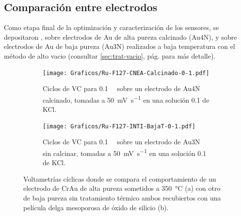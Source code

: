     \subsection{Comparación entre electrodos}


    	Como etapa final de la optimización y caracterización de los sensores, se depositaron \pdm, sobre electrodos de Au de alta pureza calcinado (Au4N), y sobre electrodos de Au de baja pureza (Au3N) realizados a baja temperatura con el método de alto vacio (consultar \ref{sec:trat-vacio}, pág. \pageref{sec:trat-vacio} para más detalle). 

    			 \begin{figure}[ht!]
		 	      \begin{subfigure}[t]{0.495\textwidth}
		          	\texttt{[image: Graficos/Ru-F127-CNEA-Calcinado-0-1.pdf]}
		         	\caption{Ciclos de VC para \ru\space \SI{0.1}{\milli\Molar} sobre un electrodo de Au4N calcinado, tomadas a \SI{50}{\milli\volt\per\second} en una solución \SI{0.1}{\Molar} de KCl.}
		          	\label{fig:Au4N-Ru1mM}
		      		\end{subfigure}
		      	 \begin{subfigure}[t]{0.495\textwidth}
		          	\texttt{[image: Graficos/Ru-F127-INTI-BajaT-0-1.pdf]}
		         	\caption{Ciclos de VC para \ru\space \SI{0.1}{\milli\Molar} sobre un electrodo de Au3N sin calcinar, tomadas a \SI{50}{\milli\volt\per\second} en una solución \SI{0.1}{\Molar} de KCl.}
		          	\label{fig:Au3N-Ru1mM}
		      		\end{subfigure}
		      	 \caption[Comparación \pdm\space sobre diferentes electrodos]{Voltametrías cíclicas donde se compara el comportamiento de un electrodo de Cr\textbar Au de alta pureza sometidos a \SI{350}{\celsius} (a) con otro de baja pureza sin tratamiento térmico ambos recubiertos con una película delga mesoporosa de óxido de silicio (b).}
		      	 \label{fig:Comparacion-meso}
	      		 \end{figure}
	    
